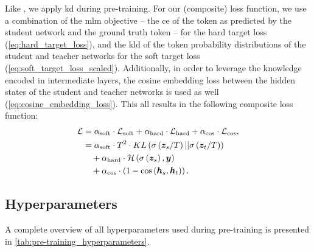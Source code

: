 Like \citet{jiao2019tinybert,sanh2019distilbert,sun2020mobilebert}, we apply \gls{kd} during pre-training. For our (composite) loss function, we use a combination of the \gls{mlm} objective -- the \gls{ce} of the token as predicted by the student network and the ground truth token -- for the hard target loss (\cref{eq:hard_target_loss}), and the \gls{kld} of the token probability distributions of the student and teacher networks for the soft target loss (\cref{eq:soft_target_loss_scaled}). Additionally, in order to leverage the knowledge encoded in intermediate layers, the cosine embedding loss between the hidden states of the student and teacher networks is used as well (\cref{eq:cosine_embedding_loss}). This all results in the following composite loss function:
\begin{align}
    \label{eq:our_combined_loss}
    \mathcal{L} &= \alpha_\text{soft} \cdot \mathcal{L}_{\text{soft}} + \alpha_\text{hard} \cdot \mathcal{L}_{\text{hard}} + \alpha_\text{cos} \cdot \mathcal{L}_{\text{cos}}, \\
    &= \alpha_\text{soft} \cdot T^2 \cdot KL\left( \softmax{\vect{z}_s / T} || \softmax{\vect{z}_t / T} \right) \nonumber \\
    &\quad+ \alpha_\text{hard} \cdot \ce{\softmax{\vect{z}_s}, \vect{y}} \nonumber \\
    &\quad+ \alpha_\text{cos} \cdot \left( 1 - \cos{\left( \hvect_s, \hvect_t \right)} \right). \nonumber
\end{align}

\subsection{Hyperparameters}
\label{subsec:hyperparameters}
A complete overview of all hyperparameters used during pre-training is presented in \cref{tab:pre-training_hyperparameters}.

